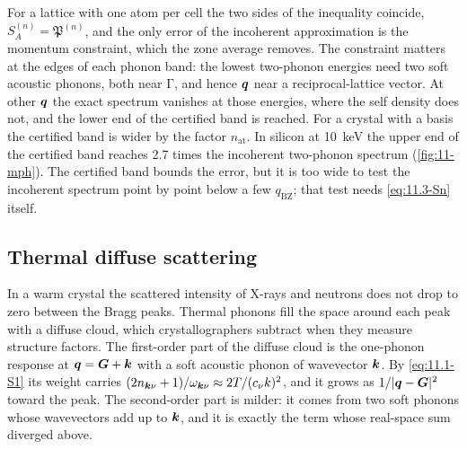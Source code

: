 \noindent For a lattice with one atom per cell the two sides of the inequality coincide, $S^{(n)}_A = \mathfrak{P}^{(n)}$, and the only error of the incoherent approximation is the momentum constraint, which the zone average removes. The constraint matters at the edges of each phonon band: the lowest two-phonon energies need two soft acoustic phonons, both near $\mathrm{\Gamma}$, and hence $\bm{q}$ near a reciprocal-lattice vector. At other $\bm{q}$ the exact spectrum vanishes at those energies, where the self density does not, and the lower end of the certified band is reached. For a crystal with a basis the certified band is wider by the factor $n_{\mathrm{at}}$. In silicon at \SI{10}{keV} the upper end of the certified band reaches 2.7 times the incoherent two-phonon spectrum (\cref{fig:11-mph}). The certified band bounds the error, but it is too wide to test the incoherent spectrum point by point below a few $q_{\mathrm{BZ}}$; that test needs \cref{eq:11.3-Sn} itself.

\subsection{Thermal diffuse scattering}

In a warm crystal the scattered intensity of X-rays and neutrons does not drop to zero between the Bragg peaks. Thermal phonons fill the space around each peak with a diffuse cloud, which crystallographers subtract when they measure structure factors. The first-order part of the diffuse cloud is the one-phonon response at $\bm{q} = \bm{G} + \bm{k}$ with a soft acoustic phonon of wavevector $\bm{k}$. By \cref{eq:11.1-S1} its weight carries $(2n_{\bm{k}\nu} + 1)/\omega_{\bm{k}\nu} \approx 2T/(c_\nu k)^2$, and it grows as $1/|\bm{q} - \bm{G}|^2$ toward the peak. The second-order part is milder: it comes from two soft phonons whose wavevectors add up to $\bm{k}$, and it is exactly the term whose real-space sum diverged above.

